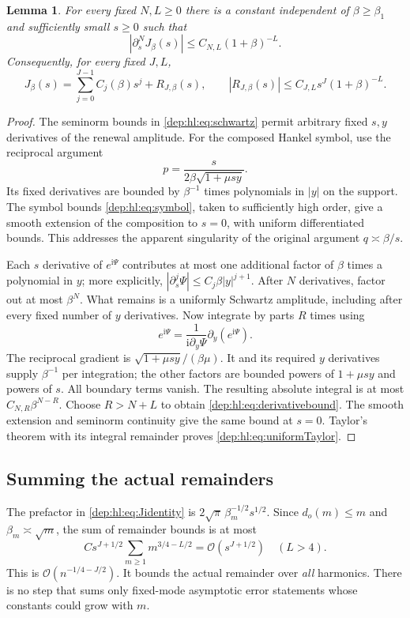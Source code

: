\documentclass[11pt]{article}
\newtheorem{lemma}[theorem]{Lemma}
\theoremstyle{definition}\newtheorem{definition}[theorem]{Definition}
\theoremstyle{remark}\newtheorem{remark}[theorem]{Remark}
\newcommand{\OO}{\mathcal O}
\newcommand{\ii}{\mathrm i}
\begin{document}
\begin{lemma}\label{dep:hl:lem:uniform}
For every fixed $N,L\ge0$ there is a constant independent of
$\beta\ge\beta_1$ and sufficiently small $s\ge0$ such that
\begin{equation}\label{dep:hl:eq:derivativebound}
 |\partial_s^N J_\beta(s)|\le C_{N,L}(1+\beta)^{-L}.
\end{equation}
Consequently, for every fixed $J,L$,
\begin{equation}\label{dep:hl:eq:uniformTaylor}
 J_\beta(s)=\sum_{j=0}^{J-1}C_j(\beta)s^j+R_{J,\beta}(s),\qquad
 |R_{J,\beta}(s)|\le C_{J,L}s^J(1+\beta)^{-L}.
\end{equation}
\end{lemma}
\begin{proof}
The seminorm bounds in \eqref{dep:hl:eq:schwartz} permit arbitrary fixed
$s,y$ derivatives of the renewal amplitude. For the composed Hankel
symbol, use the reciprocal argument
\[
 p=\frac{s}{2\beta\sqrt{1+\mu sy}}.
\]
Its fixed derivatives are bounded by $\beta^{-1}$ times polynomials in
$|y|$ on the support. The symbol bounds \eqref{dep:hl:eq:symbol}, taken to
sufficiently high order, give a smooth extension of the composition to
$s=0$, with uniform differentiated bounds. This addresses the apparent
singularity of the original argument $q\asymp\beta/s$.

Each $s$ derivative of $e^{\ii\Psi}$ contributes at most one additional
factor of $\beta$ times a polynomial in $y$; more explicitly,
$|\partial_s^j\Psi|\le C_j\beta|y|^{j+1}$. After $N$ derivatives,
factor out at most $\beta^N$. What remains is a uniformly Schwartz
amplitude, including after every fixed number of $y$ derivatives.
Now integrate by parts $R$ times using
\[
 e^{\ii\Psi}=\frac{1}{\ii\partial_y\Psi}
                         \partial_y(e^{\ii\Psi}).
\]
The reciprocal gradient is
$\sqrt{1+\mu sy}/(\beta\mu)$. It and its required $y$ derivatives
supply $\beta^{-1}$ per integration; the other factors are bounded
powers of $1+\mu sy$ and powers of $s$. All boundary terms vanish.
The resulting absolute integral is at most
$C_{N,R}\beta^{N-R}$. Choose $R>N+L$ to obtain
\eqref{dep:hl:eq:derivativebound}. The smooth extension and seminorm
continuity give the same bound at $s=0$. Taylor's theorem with its
integral remainder proves \eqref{dep:hl:eq:uniformTaylor}.
\end{proof}

\subsection{Summing the actual remainders}
The prefactor in \eqref{dep:hl:eq:Jidentity} is
$2\sqrt\pi\,\beta_m^{-1/2}s^{1/2}$. Since $d_o(m)\le m$ and
$\beta_m\asymp\sqrt m$, the sum of remainder bounds is at most
\[
 C s^{J+1/2}\sum_{m\ge1}m^{3/4-L/2}=\OO(s^{J+1/2})
 \quad(L>4).
\]
This is $\OO(n^{-1/4-J/2})$. It bounds the actual remainder over
\emph{all} harmonics. There is no step that sums only fixed-mode
asymptotic error statements whose constants could grow with $m$.
\end{document}
